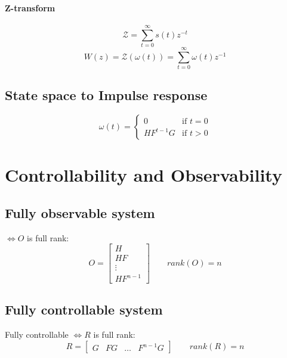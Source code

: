 \documentclass{report}
\begin{document}
\paragraph{Z-transform} 
\[
\mathcal{Z}=\sum_{t=0}^\infty s(t)z^{-t}
\]
\[
W(z)=\mathcal{Z}(\omega(t))=\sum_{t=0}^\infty \omega(t)z^{-1}
\]

\subsection{State space to Impulse response}
\[
\omega(t)=
\begin{cases}
0 & \text{if } t=0\\
HF^{t-1}G & \text{if } t>0
\end{cases}
\]

\section{Controllability and Observability}

\subsection{Fully observable system} $\iff O$ is full rank:
\[
O=\begin{bmatrix}
H\\HF\\\vdots\\HF^{n-1}
\end{bmatrix}
\qquad
rank(O)=n
\]
\subsection{Fully controllable system} Fully controllable $\iff R$ is full rank:
\[
R=\begin{bmatrix}
G&FG&\dots&F^{n-1}G
\end{bmatrix}
\qquad
rank(R)=n
\]
\end{document}
